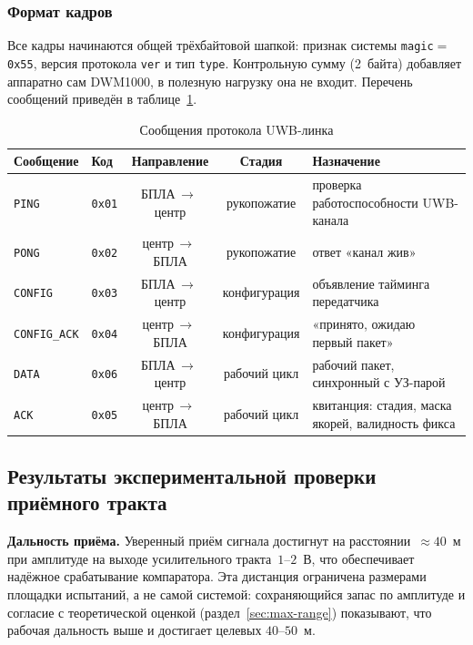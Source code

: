 \subsubsection{Формат кадров}

Все кадры начинаются общей трёхбайтовой шапкой: признак системы
\texttt{magic}${=}$\texttt{0x55}, версия протокола \texttt{ver} и тип \texttt{type}.
Контрольную сумму (2~байта) добавляет аппаратно сам DWM1000, в полезную нагрузку
она не входит. Перечень сообщений приведён в таблице~\ref{tab:uwb-msgs}.

\begin{table}[h!]
\centering
\caption{Сообщения протокола UWB-линка}
\label{tab:uwb-msgs}
\small
\begin{tabular}{@{}llccp{5.9cm}@{}}
\toprule
Сообщение & Код & Направление & Стадия & Назначение \\ \midrule
\texttt{PING}        & \texttt{0x01} & БПЛА\,$\to$\,центр & рукопожатие  & проверка работоспособности UWB-канала \\
\texttt{PONG}        & \texttt{0x02} & центр\,$\to$\,БПЛА & рукопожатие  & ответ «канал жив» \\
\texttt{CONFIG}      & \texttt{0x03} & БПЛА\,$\to$\,центр & конфигурация & объявление тайминга передатчика \\
\texttt{CONFIG\_ACK} & \texttt{0x04} & центр\,$\to$\,БПЛА & конфигурация & «принято, ожидаю первый пакет» \\
\texttt{DATA}        & \texttt{0x06} & БПЛА\,$\to$\,центр & рабочий цикл & рабочий пакет, синхронный с УЗ-парой \\
\texttt{ACK}         & \texttt{0x05} & центр\,$\to$\,БПЛА & рабочий цикл & квитанция: стадия, маска якорей, валидность фикса \\
\bottomrule
\end{tabular}
\end{table}

\FloatBarrier

\subsection{Результаты экспериментальной проверки приёмного тракта}
\label{sec:exp}

\textbf{Дальность приёма.}
Уверенный приём сигнала достигнут на расстоянии~${\approx}40$~м при амплитуде на выходе
усилительного тракта~$1\text{--}2$~В, что обеспечивает надёжное срабатывание компаратора.
Эта дистанция ограничена размерами площадки испытаний, а не самой системой: сохраняющийся
запас по амплитуде и согласие с теоретической оценкой (раздел~\ref{sec:max-range})
показывают, что рабочая дальность выше и достигает целевых $40$--$50$~м.

